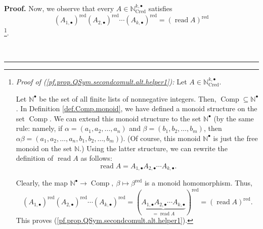 \documentclass[numbers=enddot,12pt,final,onecolumn,notitlepage,abstracton]{scrartcl}%
\theoremstyle{definition}
\newenvironment{proof}[1][Proof]{\noindent\textbf{#1.} }{\ \rule{0.5em}{0.5em}}
\begin{document}
\begin{proof}
Now, we observe that every $A\in\mathbb{N}_{\operatorname*{Cred}}^{k,\bullet}$
satisfies
\begin{equation}
\left(  A_{1,\bullet}\right)  ^{\operatorname*{red}}\left(  A_{2,\bullet
}\right)  ^{\operatorname*{red}}\cdots\left(  A_{k,\bullet}\right)
^{\operatorname*{red}}=\left(  \operatorname*{read}A\right)
^{\operatorname*{red}} \label{pf.prop.QSym.secondcomult.alt.helper1}%
\end{equation}
\footnote{\textit{Proof of (\ref{pf.prop.QSym.secondcomult.alt.helper1}):} Let
$A\in\mathbb{N}_{\operatorname*{Cred}}^{k,\bullet}$.
\par
Let $\mathbb{N}^{\bullet}$ be the set of all finite lists of nonnegative
integers. Then, $\operatorname*{Comp}\subseteq\mathbb{N}^{\bullet}$. In
Definition \ref{def.Comp.monoid}, we have defined a monoid structure on the
set $\operatorname*{Comp}$. We can extend this monoid structure to the set
$\mathbb{N}^{\bullet}$ (by the same rule: namely, if $\alpha=\left(
a_{1},a_{2},\ldots,a_{n}\right)  $ and $\beta=\left(  b_{1},b_{2},\ldots
,b_{m}\right)  $, then $\alpha\beta=\left(  a_{1},a_{2},\ldots,a_{n}%
,b_{1},b_{2},\ldots,b_{m}\right)  $). (Of course, this monoid $\mathbb{N}%
^{\bullet}$ is just the free monoid on the set $\mathbb{N}$.) Using the latter
structure, we can rewrite the definition of $\operatorname*{read}A$ as
follows:%
\[
\operatorname*{read}A=A_{1,\bullet}A_{2,\bullet}\cdots A_{k,\bullet}.
\]
\par
Clearly, the map $\mathbb{N}^{\bullet}\rightarrow\operatorname*{Comp}%
,\ \beta\mapsto\beta^{\operatorname*{red}}$ is a monoid homomorphism. Thus,%
\[
\left(  A_{1,\bullet}\right)  ^{\operatorname*{red}}\left(  A_{2,\bullet
}\right)  ^{\operatorname*{red}}\cdots\left(  A_{k,\bullet}\right)
^{\operatorname*{red}}=\left(  \underbrace{A_{1,\bullet}A_{2,\bullet}\cdots
A_{k,\bullet}}_{=\operatorname*{read}A}\right)  ^{\operatorname*{red}}=\left(
\operatorname*{read}A\right)  ^{\operatorname*{red}}.
\]
This proves (\ref{pf.prop.QSym.secondcomult.alt.helper1}).}.


\end{proof}
\end{document}
